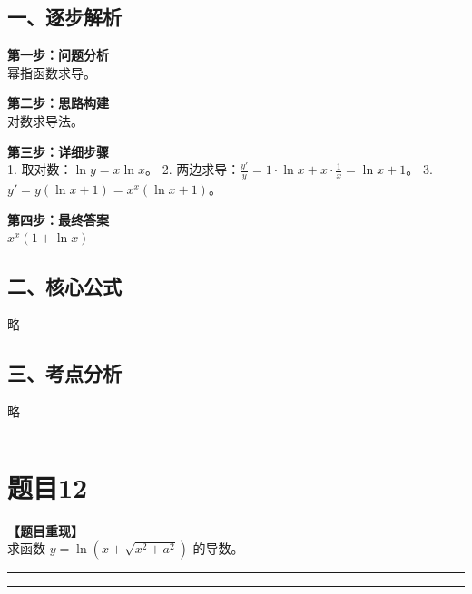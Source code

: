 \documentclass[12pt, a4paper]{ctexart}
\newcommand{\TopSeparator}{
    \par\noindent\rule{\textwidth}{1.5pt}\vspace{0.5em} %
}
\newcommand{\AnalysisSeparator}{
    \par\noindent\rule{\textwidth}{0.5pt}\vspace{0.2em}\hrule\vspace{0.5em} %
}
\newenvironment{RedAnalysis}{
    \par
    \color{red} %
}{
    \par
    \color{black} %
}
\begin{document}
\begin{RedAnalysis}

\subsection*{一、逐步解析}

\textbf{第一步：问题分析} \\
幂指函数求导。

\textbf{第二步：思路构建} \\
对数求导法。

\textbf{第三步：详细步骤} \\
1. 取对数：$\ln y = x \ln x$。
2. 两边求导：$\frac{y'}{y} = 1 \cdot \ln x + x \cdot \frac{1}{x} = \ln x + 1$。
3. $y' = y(\ln x + 1) = x^x(\ln x + 1)$。

\textbf{第四步：最终答案} \\
$x^x(1+\ln x)$

\subsection*{二、核心公式}
略

\subsection*{三、考点分析}
略

\end{RedAnalysis}

\vspace{2em}

\TopSeparator
\section*{题目12}

\textbf{【题目重现】} \\
求函数 $ y = \ln(x + \sqrt{x^{2} + a^{2}}) $ 的导数。

\AnalysisSeparator
\end{document}
